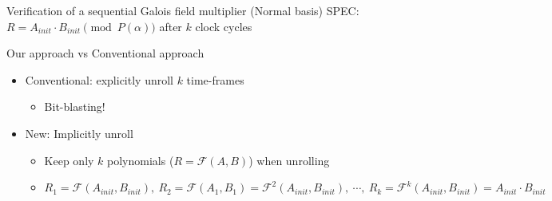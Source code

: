 \documentclass[xcolor=dvipsnames]{beamer}
\newcommand{\bi}{\begin{itemize}}
\newcommand{\ei}{\end{itemize}}
\newcommand{\F}{{\mathcal{F}}}
\begin{document}
\begin{frame}{\large{Verification of a sequential Galois field multiplier (Normal basis)}}
SPEC: $R = A_{init}\cdot B_{init} \pmod {P(\alpha)}$ after $k$ clock cycles
\hspace{-0.3in}\begin{figure}[hbt]
\end{figure}
\end{frame}
\begin{frame}{\large{Our approach vs Conventional approach}}
\vspace{-0.1in}
\begin{figure}[H]
\end{figure}
\vspace{-0.4in}
\bi
\item Conventional: explicitly unroll $k$ time-frames
	\bi
	\item Bit-blasting!
	\ei
\item New: \alert{Implicitly} unroll
	\bi
	\item Keep only $k$ polynomials ($R = \F(A,B)$) when unrolling
	\item $R_1 = \F(A_{init},B_{init}),~R_2 = \F(A_{1},B_{1}) = \F^2(A_{init},B_{init}),~ 
	\cdots, ~ R_k = \F^k(A_{init},B_{init}) = A_{init}\cdot B_{init}$
	\ei
\ei
\end{frame}
\end{document}
